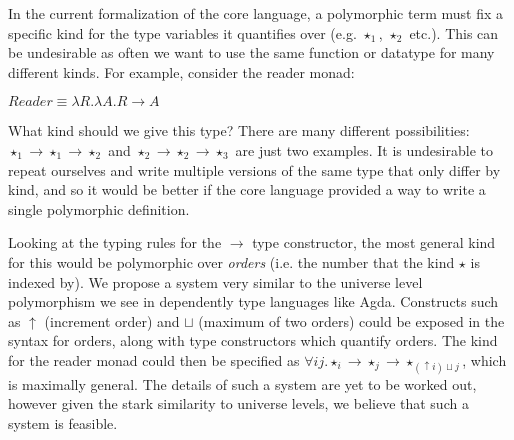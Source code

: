 \documentclass[runningheads]{llncs}
\begin{document}
In the current formalization of the core language, a polymorphic term must fix a specific kind for the type variables it quantifies over (e.g. $\star_1$, $\star_2$ etc.). This can be undesirable as often we want to use the same function or datatype for many different kinds. For example, consider the reader monad:

$Reader \equiv \lambda R. \lambda A. R \rightarrow A$

What kind should we give this type? There are many different possibilities: $\star_1 \rightarrow \star_1 \rightarrow \star_2$ and $\star_2 \rightarrow \star_2 \rightarrow \star_3$ are just two examples. It is undesirable to repeat ourselves and write multiple versions of the same type that only differ by kind, and so it would be better if the core language provided a way to write a single polymorphic definition.



Looking at the typing rules for the $\rightarrow$ type constructor, the most general kind for this would be polymorphic over \emph{orders} (i.e. the number that the kind $\star$ is indexed by). We propose a system very similar to the universe level polymorphism \cite{kovacs2021generalized} we see in dependently type languages like Agda. Constructs such as $\uparrow$ (increment order) and $\sqcup$ (maximum of two orders) could be exposed in the syntax for orders, along with type constructors which quantify orders. The kind for the reader monad could then be specified as $\forall i j. \star_i \rightarrow \star_j \rightarrow \star_{(\uparrow i) \sqcup j}$, which is maximally general. The details of such a system are yet to be worked out, however given the stark similarity to universe levels, we believe that such a system is feasible.

\end{document}
